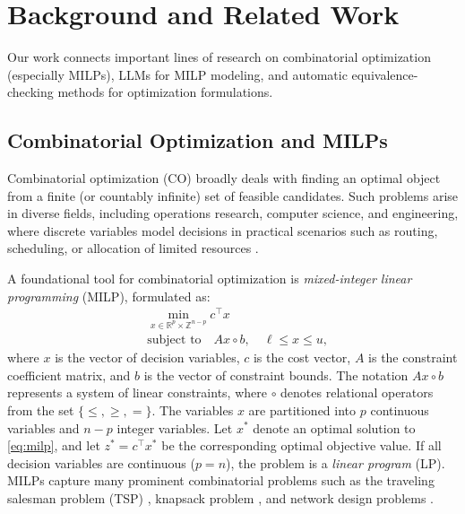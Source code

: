 \section{Background and Related Work}
\label{sec:related-work}

Our work connects important lines of research on combinatorial optimization (especially MILPs), LLMs for MILP modeling, and automatic equivalence-checking methods for optimization formulations.

\subsection{Combinatorial Optimization and MILPs}

Combinatorial optimization (CO) broadly deals with finding an optimal object from a finite (or countably infinite) set of feasible candidates. Such problems arise in diverse fields, including operations research, computer science, and engineering, where discrete variables model decisions in practical scenarios such as routing, scheduling, or allocation of limited resources \cite{Papadimitriou82}. 

A foundational tool for combinatorial optimization is \emph{mixed-integer linear programming} (MILP), formulated as:
\begin{equation}
\label{eq:milp}
\begin{aligned}
& \min_{x \in \mathbb{R}^p \times \mathbb{Z}^{n-p}}  c^\top x \\
& \text{subject to} \quad A x \circ b, \quad \ell \leq x \leq u,
\end{aligned}
\end{equation}
where \( x \) is the vector of decision variables, \( c \) is the cost vector, \( A \) is the constraint coefficient matrix, and \( b \) is the vector of constraint bounds. The notation \( A x \circ b \) represents a system of linear constraints, where \( \circ \) denotes relational operators from the set \(\{\leq, \geq, =\}\). The variables \( x \) are partitioned into \( p \) continuous variables and \( n - p \) integer variables. Let \( x^* \) denote an optimal solution to \eqref{eq:milp}, and let \(z^* = c^\top x^*\) be the corresponding optimal objective value. If all decision variables are continuous (\( p = n \)), the problem is a \emph{linear program} (LP).
 MILPs capture many prominent combinatorial problems such as the traveling salesman problem (TSP) \cite{Applegate06}, knapsack problem \cite{Kellerer04}, and network design problems \cite{Johnson78}.

